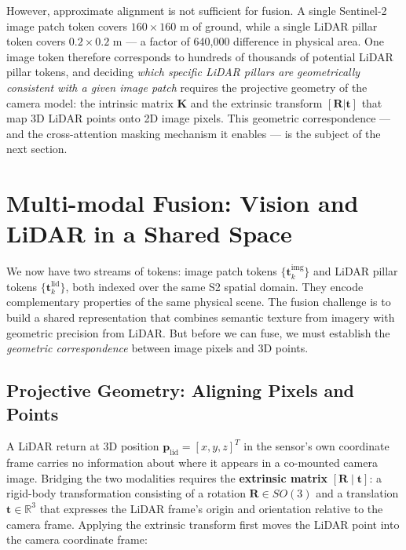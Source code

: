 \documentclass{book}
\begin{document}
However, approximate alignment is not sufficient for fusion.  A
single Sentinel-2 image patch token covers $160 \times 160$ m of
ground, while a single LiDAR pillar token covers $0.2 \times 0.2$ m
--- a factor of 640,000 difference in physical area.  One image token
therefore corresponds to hundreds of thousands of potential LiDAR
pillar tokens, and deciding \emph{which specific LiDAR pillars are
geometrically consistent with a given image patch} requires the
projective geometry of the camera model: the intrinsic matrix
$\mathbf{K}$ and the extrinsic transform $[\mathbf{R}|\mathbf{t}]$
that map 3D LiDAR points onto 2D image pixels.  This geometric
correspondence --- and the cross-attention masking mechanism it
enables --- is the subject of the next section.

 
\section{Multi-modal Fusion: Vision and LiDAR in a Shared Space}
 
We now have two streams of tokens: image patch tokens
$\{\mathbf{t}^{\text{img}}_k\}$ and LiDAR pillar tokens
$\{\mathbf{t}^{\text{lid}}_k\}$, both indexed over the same S2
spatial domain.  They encode complementary properties of the same
physical scene.  The fusion challenge is to build a shared
representation that combines semantic texture from imagery with
geometric precision from LiDAR.  But before we can fuse, we must
establish the \emph{geometric correspondence} between image pixels
and 3D points.
 
\subsection{Projective Geometry: Aligning Pixels and Points}
\label{sec:projection}

A LiDAR return at 3D position $\mathbf{p}_{\text{lid}} =
[x, y, z]^T$ in the sensor's own coordinate frame carries no
information about where it appears in a co-mounted camera image.
Bridging the two modalities requires the \textbf{extrinsic matrix}
$[\mathbf{R} \mid \mathbf{t}]$: a rigid-body transformation
consisting of a rotation $\mathbf{R} \in SO(3)$ and a translation
$\mathbf{t} \in \mathbb{R}^3$ that expresses the LiDAR frame's
origin and orientation relative to the camera frame.  Applying the
extrinsic transform first moves the LiDAR point into the camera
coordinate frame:
\end{document}
